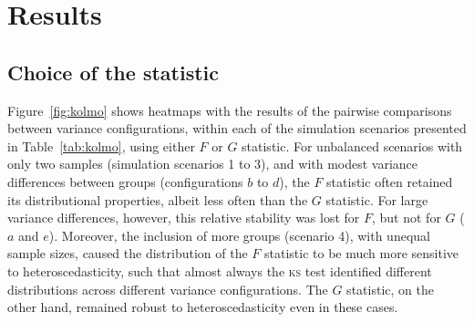 \section{Results}

\subsection{Choice of the statistic}
\label{sec:perm:results_statistic}

Figure~\ref{fig:kolmo} shows heatmaps with the results of the pairwise comparisons between variance configurations, within each of the simulation scenarios presented in Table~\ref{tab:kolmo}, using either $F$ or $G$ statistic. For unbalanced scenarios with only two samples (simulation scenarios 1 to 3), and with modest variance differences between groups (configurations $b$ to $d$), the $F$ statistic often retained its distributional properties, albeit less often than the $G$ statistic. For large variance differences, however, this relative stability was lost for $F$, but not for $G$ ($a$ and $e$). Moreover, the inclusion of more groups (scenario 4), with unequal sample sizes, caused the distribution of the $F$ statistic to be much more sensitive to heteroscedasticity, such that almost always the \textsc{ks} test identified different distributions across different variance configurations. The $G$ statistic, on the other hand, remained robust to heteroscedasticity even in these cases.

